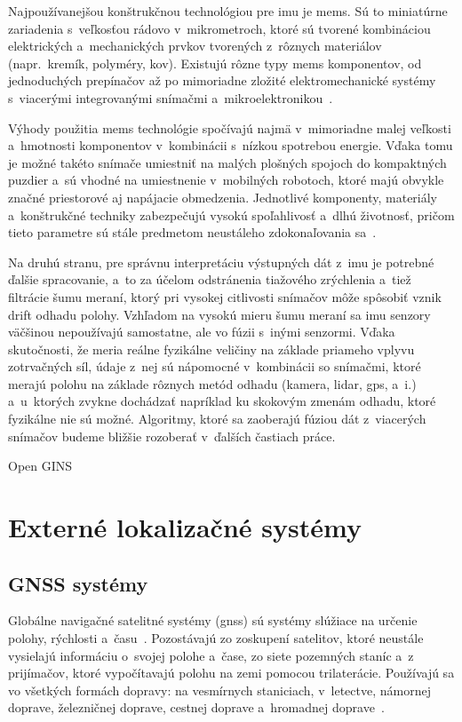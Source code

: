       Najpoužívanejšou konštrukčnou technológiou pre \acrshort{imu} je \acrshort{mems}. Sú to miniatúrne zariadenia s~veľkosťou rádovo v~mikrometroch, ktoré sú tvorené kombináciou elektrických a~mechanických prvkov tvorených z~rôznych materiálov (napr.\ kremík, polyméry, kov). Existujú rôzne typy \acrshort{mems} komponentov, od jednoduchých prepínačov až po mimoriadne zložité elektromechanické systémy s~viacerými integrovanými snímačmi a~mikroelektronikou~\cite{InertialMeasurementUnit2023}.

      Výhody použitia \acrshort{mems} technológie spočívajú najmä v~mimoriadne malej veľkosti a~hmotnosti komponentov v~kombinácii s~nízkou spotrebou energie. Vďaka tomu je možné takéto snímače umiestniť na malých plošných spojoch do kompaktných puzdier a~sú vhodné na umiestnenie v~mobilných robotoch, ktoré majú obvykle značné priestorové aj napájacie obmedzenia. Jednotlivé komponenty, materiály a~konštrukčné techniky zabezpečujú vysokú spoľahlivosť a~dlhú životnosť, pričom tieto parametre sú stále predmetom neustáleho zdokonaľovania sa~\cite{InertialMeasurementUnit2023}.

      Na druhú stranu, pre správnu interpretáciu výstupných dát z~\acrshort{imu} je potrebné ďalšie spracovanie, a~to za účelom odstránenia tiažového zrýchlenia a~tiež filtrácie šumu meraní, ktorý pri vysokej citlivosti snímačov môže spôsobiť vznik drift odhadu polohy. Vzhľadom na vysokú mieru šumu meraní sa \acrshort{imu} senzory väčšinou nepoužívajú samostatne, ale vo fúzii s~inými senzormi. Vďaka skutočnosti, že meria reálne fyzikálne veličiny na základe priameho vplyvu zotrvačných síl, údaje z~nej sú nápomocné v~kombinácii so snímačmi, ktoré merajú polohu na základe rôznych metód odhadu (kamera, lidar, \acrshort{gps}, a~i.) a~u~ktorých zvykne dochádzať napríklad ku skokovým zmenám odhadu, ktoré fyzikálne nie sú možné. Algoritmy, ktoré sa zaoberajú fúziou dát z~viacerých snímačov budeme bližšie rozoberať v~ďalších častiach práce.

      Open GINS

\section{Externé lokalizačné systémy}\label{sec:absolute}

  \subsection{GNSS systémy}
    
    Globálne navigačné satelitné systémy (\acrshort{gnss}) sú systémy slúžiace na určenie polohy, rýchlosti a~času~\cite{duchonSnimaceMobilnejRobotike2012}. Pozostávajú zo zoskupení satelitov, ktoré neustále vysielajú informáciu o~svojej polohe a~čase, zo siete pozemných staníc a~z prijímačov, ktoré vypočítavajú polohu na zemi pomocou trilaterácie. Používajú sa vo všetkých formách dopravy: na vesmírnych staniciach, v~letectve, námornej doprave, železničnej doprave, cestnej doprave a~hromadnej doprave~\cite{GNSS}.

